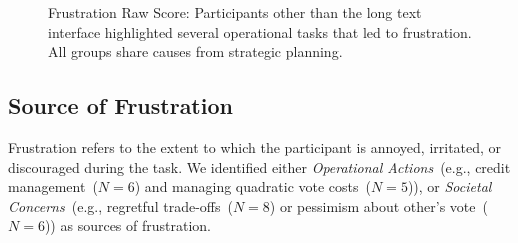
%

\begin{figure} %
    \centering
    \captionsetup{width=0.9\linewidth, justification=justified}
    \caption{Frustration Raw Score: Participants other than the long text interface highlighted several operational tasks that led to frustration. All groups share causes from strategic planning.}
    \label{fig:frustration_cog_score}
\end{figure}

\subsection{Source of Frustration} 
\label{sec:frustration}

Frustration refers to the extent to which the participant is annoyed, irritated, or discouraged during the task. We identified either \textit{Operational Actions}~(e.g., credit management~($N=6$) and managing quadratic vote costs~($N=5$)), or \textit{Societal Concerns}~(e.g., regretful trade-offs~($N=8$) or pessimism about other's vote~($N=6$)) as sources of frustration.

